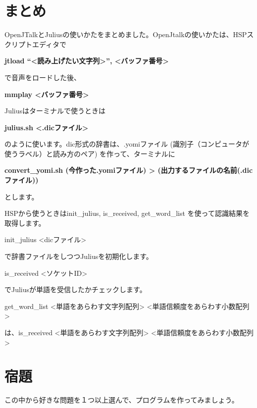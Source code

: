 \documentclass[a4paper,dvipdfmx]{jarticle}
\begin{document}
\section{まとめ}
{
OpenJTalkとJuliusの使いかたをまとめました。OpenJtalkの使いかたは、HSPスクリプトエディタで}

{\ttfamily\bfseries
jtload ``{\textless}読み上げたい文字列{\textgreater}'',
{\textless}バッファ番号{\textgreater}}

{
で音声をロードした後、}

{\ttfamily\bfseries
mmplay {\textless}バッファ番号{\textgreater}}


\bigskip

{
Juliusはターミナルで使うときは}

{\ttfamily\bfseries
julius.sh {\textless}.dicファイル{\textgreater}}

{
のように使います。dic形式の辞書は、.yomiファイル
(識別子（コンピュータが使うラベル）と読み方のペア)
を作って、ターミナルに\ \ }

{\ttfamily\bfseries
convert\_yomi.sh (今作った.yomiファイル) {\textgreater}
(出力するファイルの名前(.dicファイル))}

{
とします。}

{
HSPから使うときはinit\_julius, is\_received, get\_word\_list
を使って認識結果を取得します。}

{
init\_julius {\textless}dicファイル{\textgreater}}

{
で辞書ファイルをしつつJuliusを初期化します。}

{
is\_received {\textless}ソケットID{\textgreater}}

{
でJuliusが単語を受信したかチェックします。}

{
get\_word\_list
{\textless}単語をあらわす文字列配列{\textgreater}
{\textless}単語信頼度をあらわす小数配列{\textgreater}}

{
は、is\_received
{\textless}単語をあらわす文字列配列{\textgreater}
{\textless}単語信頼度をあらわす小数配列{\textgreater}}

\section{宿題}
{
この中から好きな問題を１つ以上選んで、プログラムを作ってみましょう。}
\end{document}
